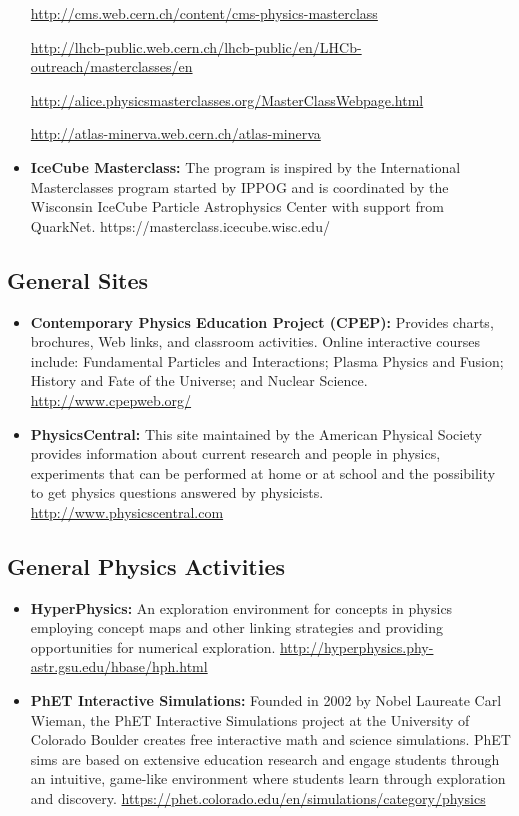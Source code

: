 \begin{itemize}
  \url{http://cms.web.cern.ch/content/cms-physics-masterclass}

  \url{http://lhcb-public.web.cern.ch/lhcb-public/en/LHCb-outreach/masterclasses/en}

  \url{http://alice.physicsmasterclasses.org/MasterClassWebpage.html}

  \url{http://atlas-minerva.web.cern.ch/atlas-minerva}
\item
  \textbf{IceCube Masterclass:} The program is inspired by the
  International Masterclasses program started by IPPOG and is
  coordinated by the Wisconsin IceCube Particle Astrophysics Center with
  support from QuarkNet. https://masterclass.icecube.wisc.edu/
\end{itemize}

\subsection{General Sites}\label{databases:subsec:generalsites}

\begin{itemize}
\item
  \textbf{Contemporary Physics Education Project (CPEP):} Provides
  charts, brochures, Web links, and classroom activities. Online
  interactive courses include: Fundamental Particles and Interactions;
  Plasma Physics and Fusion; History and Fate of the Universe; and
  Nuclear Science. \url{http://www.cpepweb.org/}
\item
  \textbf{PhysicsCentral:} This site maintained by the American Physical
  Society provides information about current research and people in
  physics, experiments that can be performed at home or at school and
  the possibility to get physics questions answered by physicists.
  \url{http://www.physicscentral.com}
\end{itemize}

\subsection{General Physics
Activities}\label{databases:subsec:genphysactivities}

\begin{itemize}
\item
  \textbf{HyperPhysics:} An exploration environment for concepts in
  physics employing concept maps and other linking strategies and
  providing opportunities for numerical exploration.
  \url{http://hyperphysics.phy-astr.gsu.edu/hbase/hph.html}
\item
  \textbf{PhET Interactive Simulations:} Founded in 2002 by Nobel
  Laureate Carl Wieman, the PhET Interactive Simulations project at the
  University of Colorado Boulder creates free interactive math and
  science simulations. PhET sims are based on extensive education
  research and engage students through an intuitive, game-like
  environment where students learn through exploration and discovery.
  \url{https://phet.colorado.edu/en/simulations/category/physics}
\end{itemize}

